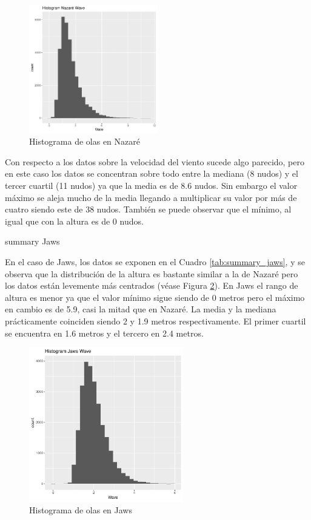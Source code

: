 \begin{figure}[H]
\centering
\includegraphics[height=5.6cm]{./figures/nazare_hist_wave.pdf}
  \caption{Histograma de olas en Nazaré}
  \label{fig:hist_waves_nazare}
\end{figure}
Con respecto a los datos sobre la velocidad del viento sucede algo parecido, pero en este caso los datos se concentran sobre todo entre la mediana (8 nudos) y el tercer cuartil (11 nudos) ya que la media es de 8.6 nudos. Sin embargo el valor máximo se aleja mucho de la media llegando a multiplicar su valor por más de cuatro siendo este de 38 nudos. También se puede observar que el mínimo, al igual que con la altura es de 0 nudos.

\begin{table}[htbp]
\centering

\caption{summary Jaws}
\label{tab:summary_jaws}
\end{table}


En el caso de Jaws, los datos se exponen en el Cuadro \ref{tab:summary_jaws}, y se observa que la distribución de la altura es bastante similar a la de Nazaré pero los datos están levemente más centrados (véase Figura \ref{fig:hist_waves_jaws}). En Jaws el rango de altura es menor ya que el valor mínimo sigue siendo de 0 metros pero el máximo en cambio es de 5.9, casi la mitad que en Nazaré. La media y la mediana prácticamente coinciden siendo 2 y 1.9 metros respectivamente. El primer cuartil se encuentra en 1.6 metros y el tercero en 2.4 metros.



\begin{figure}[H]
\centering
\includegraphics[width=0.6\textwidth]{./figures/jaws_hist_wave.pdf}
  \caption{Histograma de olas en Jaws}
  \label{fig:hist_waves_jaws}
\end{figure}

